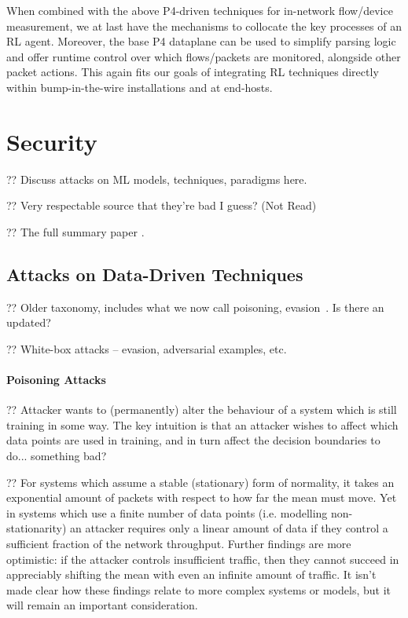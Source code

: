When combined with the above P4-driven techniques for in-network flow/device measurement, we at last have the mechanisms to collocate the key processes of an RL agent.
Moreover, the base P4 dataplane can be used to simplify parsing logic and offer runtime control over which flows/packets are monitored, alongside other packet actions.
This again fits our goals of integrating RL techniques directly within bump-in-the-wire installations and at end-hosts.

\section{Security}

?? Discuss attacks on ML models, techniques, paradigms here.

?? Very respectable source \cite{DBLP:conf/eurosp/PapernotMJFCS16} that they're bad I guess? (Not Read)

?? The full summary paper \cite{DBLP:conf/eurosp/PapernotMSW18}.

\subsection{Attacks on Data-Driven Techniques}

?? Older taxonomy, includes what we now call poisoning, evasion~\cite{DBLP:conf/ccs/BarrenoNSJT06}. Is there an updated?

?? White-box attacks -- evasion, adversarial examples, etc.

\paragraph{Poisoning Attacks}
?? Attacker wants to (permanently) alter the behaviour of a system which is still training in some way.
The key intuition is that an attacker wishes to affect which data points are used in training, and in turn affect the decision boundaries to do... something bad?

?? For systems which assume a stable (stationary) form of normality, it takes an exponential amount of packets with respect to how far the mean must move.
Yet in systems which use a finite number of data points (i.e. modelling non-stationarity) an attacker requires only a linear amount of data if they control a sufficient fraction of the network throughput.
Further findings are more optimistic: if the attacker controls insufficient traffic, then they cannot succeed in appreciably shifting the mean with even an infinite amount of traffic.
It isn't made clear how these findings relate to more complex systems or models, but it will remain an important consideration. \cite{DBLP:journals/jmlr/KloftL10}


